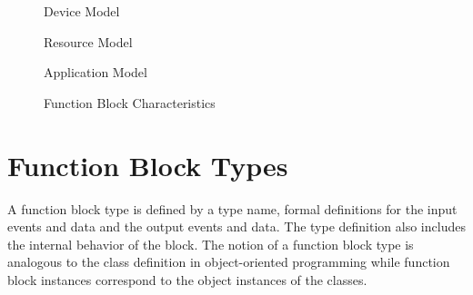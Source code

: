%
\begin{figure}
\begin{center}
 \caption[Device
Model]{Device Model{\protect ~\cite{iec:61499:2000}}}
\label{f:Device_Model}
\end{center}
\end{figure}
%

%
\begin{figure}
\begin{center}
 \caption[Resource
Model]{Resource Model{\protect ~\cite{iec:61499:2000}}}
\label{f:Resource_Model}
\end{center}
\end{figure}
%

%
\begin{figure}
\begin{center}
\caption[Application Model]{Application Model{\protect
~\cite{iec:61499:2000}}} \label{f:Application_Model}
\end{center}
\end{figure}
%

%
\begin{figure}
\begin{center}
\caption[Function Block Characteristics]{Function Block
Characteristics{\protect ~\cite{iec:61499:2000}}}
\label{f:Function_Block_Char}
\end{center}
\end{figure}
%

\section{Function Block Types}

A function block type is defined by a type name, formal
definitions for the input events and data and the output events
and data. The type definition also includes the internal behavior
of the block. The notion of a function block type is analogous to
the class definition in object-oriented programming while function
block instances correspond to the object instances of the classes.

